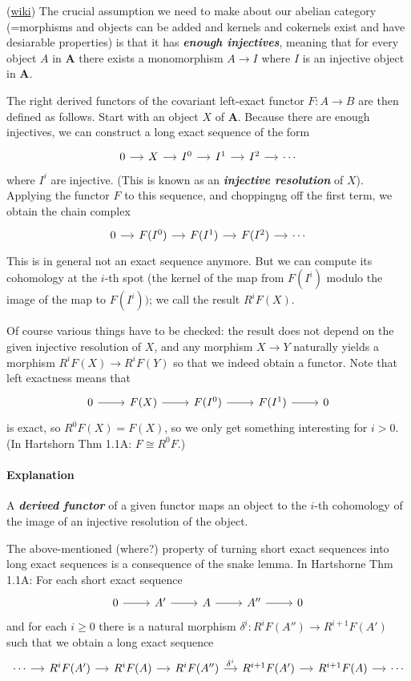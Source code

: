 (\href{https://en.wikipedia.org/wiki/Derived_functor#Construction_and_first_properties}{wiki}) The crucial assumption we need to make about our abelian category (=morphisms and objects can be added and kernels and cokernels exist and have desiarable properties) is that it has  \textit{\textbf{enough injectives}}, meaning that for every object $A$ in $\mathbf{A}$ there exists a monomorphism $A\to I$ where $I$ is an injective object in $\mathbf{A}$.

The right derived functors of the covariant left-exact functor $F:A\to B$ are then defined as follows. Start with an object $X$ of $\mathbf{A}$. Because there are enough injectives, we can construct a long exact sequence of the form
\[\begin{tikzcd}[column sep=small]
	0\arrow[r]&X\arrow[r]&I^0\arrow[r]&I^1\arrow[r]&I^2\arrow[r]&\cdots
\end{tikzcd}\]
where $I^i$ are injective. (This is known as an \textit{\textbf{injective resolution}} of $X$). Applying the functor $F$ to this sequence, and choppingng off the first term, we obtain the chain complex
\[\begin{tikzcd}[column sep=small]
	0\arrow[r]&F(I^0)\arrow[r]&F(I^1)\arrow[r]&F(I^2)\arrow[r]&\cdots
\end{tikzcd}\]
This is in general not an exact sequence anymore. But we can compute its cohomology at the $i$-th spot (the kernel of the map from $F(I^i)$ modulo the image of the map to $F(I^i))$; we call the result $R^iF(X)$.

Of course various things have to be checked: the result does not depend on the given injective resolution of $X$, and any morphism $X\to Y$ naturally yields a morphism $R^iF(X)\to R^iF(Y)$ so that we indeed obtain a functor. Note that left exactness means that
\[\begin{tikzcd}
	0\arrow[r]&F(X)\arrow[r]&F(I^0)\arrow[r]&F(I^1)\arrow[r]&0
\end{tikzcd}\]
is exact, so $R^0F(X)=F(X)$, so we only get something interesting for $i>0$. (In Hartshorn Thm 1.1A: $F\cong R^0F$.)

\paragraph{Explanation} A \textit{\textbf{derived functor}} of a given functor maps an object to the $i$-th cohomology of the image of an injective resolution of the object.

The above-mentioned (where?) property of turning short exact sequences into long exact sequences is a consequence of the snake lemma. In Hartshorne Thm 1.1A: For each short exact sequence
\[\begin{tikzcd}
	0\arrow[r]&A'\arrow[r]&A\arrow[r]&A''\arrow[r]&0
\end{tikzcd}\]
and for each $i\geq 0$ there is a natural morphism $\delta^i:R^iF(A'')\to R^{i+1}F(A')$ such that we obtain a long exact sequence
\[\begin{tikzcd}[column sep=small]
	\cdots\arrow[r]&R^iF(A')\arrow[r]&R^iF(A)\arrow[r]&R^iF(A'')\arrow[r,"\delta^i"]&R^{i+1}F(A')\arrow[r]&R^{i+1}F(A)\arrow[r]&\cdots
\end{tikzcd}\]



